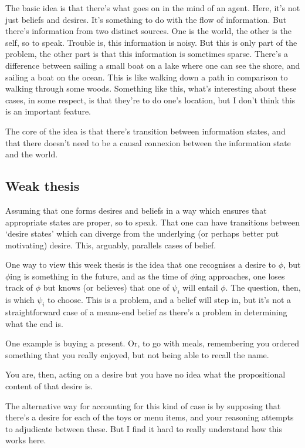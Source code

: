 \documentclass[10pt]{article}
\begin{document}
The basic idea is that there's what goes on in the mind of an agent.
Here, it's not just beliefs and desires.
It's something to do with the flow of information.
But there's information from two distinct sources.
One is the world, the other is the self, so to speak.
Trouble is, this information is noisy.
But this is only part of the problem, the other part is that this information is sometimes sparse.
There's a difference between sailing a small boat on a lake where one can see the shore, and sailing a boat on the ocean.
This is like walking down a path in comparison to walking through some woods.
Something like this, what's interesting about these cases, in some respect, is that they're to do one's location, but I don't think this is an important feature.


The core of the idea is that there's transition between information states, and that there doesn't need to be a causal connexion between the information state and the world.


\subsection{Weak thesis}
\label{sec:weak-thesis}

Assuming that one forms desires and beliefs in a way which ensures that appropriate states are proper, so to speak.
That one can have transitions between `desire states' which can diverge from the underlying (or perhaps better put motivating) desire.
This, arguably, parallels cases of belief.

One way to view this week thesis is the idea that one recognises a desire to \(\phi\), but \(\phi\)ing is something in the future, and as the time of \(\phi\)ing approaches, one loses track of \(\phi\) but knows (or believes) that one of \(\psi_{i}\) will entail \(\phi\).
The question, then, is which \(\psi_{i}\) to choose.
This is a problem, and a belief will step in, but it's not a straightforward case of a means-end belief as there's a problem in determining what the end is.

One example is buying a present.
Or, to go with meals, remembering you ordered something that you really enjoyed, but not being able to recall the name.

You are, then, acting on a desire but you have no idea what the propositional content of that desire is.

The alternative way for accounting for this kind of case is by supposing that there's a desire for each of the toys or menu items, and your reasoning attempts to adjudicate between these.
But I find it hard to really understand how this works here.
\end{document}
